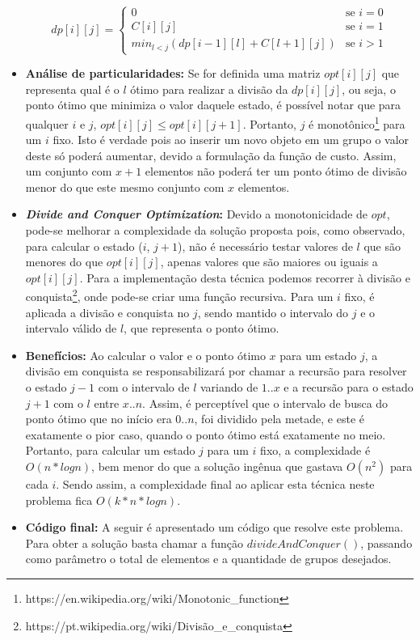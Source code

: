 \begin{itemize}[leftmargin=-.001in]
\begin{equation}
dp[i][j] =
\begin{cases}
0 &\text{se } i = 0 \\
C[i][j] &\text{se } i = 1 \\
min_{l < j}(dp[i-1][l] + C[l+1][j]) &\text{se } i > 1
\end{cases}
\label{eq:dc1}
\end{equation}

\item \textbf{Análise de particularidades:} 
Se for definida uma matriz $opt[i][j]$ que representa qual é o $l$ ótimo para realizar a divisão da $dp[i][j]$, ou seja, o ponto ótimo que minimiza o valor daquele estado, é possível notar que para qualquer $i$ e $j$, $opt[i][j] \leq opt[i][j+1]$. Portanto, $j$ é monotônico\footnote{https://en.wikipedia.org/wiki/Monotonic\_function} para um $i$ fixo. Isto é verdade pois ao inserir um novo objeto em um grupo o valor deste só poderá aumentar, devido a formulação da função de custo. Assim, um conjunto com $x+1$ elementos não poderá ter um ponto ótimo de divisão menor do que este mesmo conjunto com $x$ elementos.

\item \textbf{\textit{Divide and Conquer Optimization}:} Devido a monotonicidade de $opt$, pode-se melhorar a complexidade da solução proposta pois, como observado, para calcular o estado ($i$, $j+1$), não é necessário testar valores de $l$ que são menores do que $opt[i][j]$, apenas valores que são maiores ou iguais a $opt[i][j]$. Para a implementação desta técnica podemos recorrer à divisão e conquista\footnote{https://pt.wikipedia.org/wiki/Divisão\_e\_conquista}, onde pode-se criar uma função recursiva. Para um $i$ fixo, é aplicada a divisão e conquista no $j$, sendo mantido o intervalo do $j$ e o intervalo válido de $l$, que representa o ponto ótimo.

\item \textbf{Benefícios:} Ao calcular o valor e o ponto ótimo $x$ para um estado $j$, a divisão em conquista se responsabilizará por chamar a recursão para resolver o estado $j-1$ com o intervalo de $l$ variando de $1..x$ e a recursão para o estado $j+1$ com o $l$ entre $x..n$. Assim, é perceptível que o intervalo de busca do ponto ótimo que no início era $0..n$, foi dividido pela metade, e este é exatamente o pior caso, quando o ponto ótimo está exatamente no meio. Portanto, para calcular um estado $j$ para um $i$ fixo, a complexidade é $O(n*logn)$, bem menor do que a solução ingênua que gastava $O(n^2)$ para cada $i$. Sendo assim, a complexidade final ao aplicar esta técnica neste problema fica $O(k*n*logn)$.
\item \textbf{Código final:} A seguir é apresentado um código que resolve este problema. Para obter a solução basta chamar a função $divideAndConquer()$, passando como parâmetro o total de elementos e a quantidade de grupos desejados.
\\


\end{itemize}
